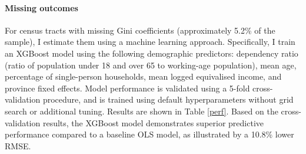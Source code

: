 \paragraph{Missing outcomes} For census tracts with missing Gini coefficients (approximately 5.2\% of the sample), I estimate them using a machine learning approach. Specifically, I train an XGBoost model using the following demographic predictors: dependency ratio (ratio of population under 18 and over 65 to working-age population), mean age, percentage of single-person households, mean logged equivalised income, and province fixed effects. Model performance is validated using a 5-fold cross-validation procedure, and is trained using default hyperparameters without grid search or additional tuning. Results are shown in Table \ref{perf}. Based on the cross-validation results, the XGBoost model demonstrates superior predictive performance compared to a baseline OLS model, as illustrated by a 10.8\% lower RMSE.

\begin{table}[H]
\centering
{}
\end{table}


